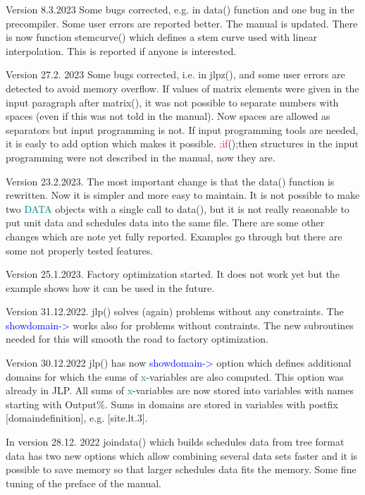 Version 8.3.2023 Some bugs corrected, e.g. in \textcolor{VioletRed}{data}() function and one bug in the precompiler. 
Some user errors are reported better. The manual is updated. There is 
now function \textcolor{VioletRed}{stemcurve}() which defines a stem curve used with linear interpolation. 
This is reported if anyone is interested. 
 
Version 27.2. 2023 Some bugs corrected, i.e. in \textcolor{VioletRed}{jlpz}(), and some user errors are detected 
to avoid memory overflow. If values of matrix elements were 
given 
in the input paragraph after \textcolor{VioletRed}{matrix}(), it was not possible to separate numbers with spaces (even if this was not 
told in the manual). Now spaces are allowed as separators but input programming is not. If 
input programming tools are needed, it is easly to add option which makes it possible. \textcolor{Red}{;if}();then 
structures in the input programming were not described in the manual, now they are. 
 
Version 23.2.2023. The most important change is that the \textcolor{VioletRed}{data}() function is rewritten. 
Now it is simpler and more easy to maintain. It is not possible to make two \textcolor{teal}{DATA} objects with 
a single call to \textcolor{VioletRed}{data}(), but it is not really reasonable to put unit data and schedules data 
into the same file. There are some other changes which are note yet fully reported. Examples go through 
but there are some not properly tested features. 
 
Version 25.1.2023. Factory optimization started. It does not work yet 
but the example shows how it can be used in the future. 
 
Version 31.12.2022. \textcolor{VioletRed}{jlp}() solves (again) problems without any constraints. 
The \textcolor{blue}{showdomain->} works also for problems without contraints. The new subroutines needed for this 
will smooth the road to factory optimization. 
 
Version 30.12.2022 \textcolor{VioletRed}{jlp}() has now \textcolor{blue}{showdomain->} option which defines additional domains for which the sums 
of \textcolor{teal}{x}-variables are also computed. This option was already in JLP. 
All sums of \textcolor{teal}{x}-variables are now stored into variables with names starting with Output\%. Sums 
in domains are stored in variables with postfix [domaindefinition], e.g. [site.lt.3]. 
 
In version 28.12. 2022 \textcolor{VioletRed}{joindata}() which builds schedules data from tree format data has two new options 
which allow combining several data sets faster and it is possible to save memory so that larger 
schedules data fits the memory. Some fine tuning of the preface of the manual. 
 
